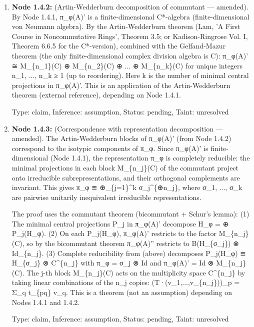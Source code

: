 \documentclass{article}
\begin{document}
\begin{enumerate}
\begin{enumerate}
  Type: claim, Inference: assumption, Status: validated, Taint: unresolved

\item \textbf{Node 1.4.2:} (Artin-Wedderburn decomposition of commutant — amended). By Node 1.4.1, π\_φ(A)' is a finite-dimensional C*-algebra (finite-dimensional von Neumann algebra). By the Artin-Wedderburn theorem (Lam, 'A First Course in Noncommutative Rings', Theorem 3.5; or Kadison-Ringrose Vol. I, Theorem 6.6.5 for the C*-version), combined with the Gelfand-Mazur theorem (the only finite-dimensional complex division algebra is C): π\_φ(A)' ≅ M\_\{n\_1\}(C) ⊕ M\_\{n\_2\}(C) ⊕ ... ⊕ M\_\{n\_k\}(C) for unique integers n\_1, ..., n\_k ≥ 1 (up to reordering). Here k is the number of minimal central projections in π\_φ(A)'. This is an application of the Artin-Wedderburn theorem (external reference), depending on Node 1.4.1.

  Type: claim, Inference: assumption, Status: pending, Taint: unresolved

\item \textbf{Node 1.4.3:} (Correspondence with representation decomposition — amended). The Artin-Wedderburn blocks of π\_φ(A)' (from Node 1.4.2) correspond to the isotypic components of π\_φ. Since π\_φ(A)' is finite-dimensional (Node 1.4.1), the representation π\_φ is completely reducible: the minimal projections in each block M\_\{n\_j\}(C) of the commutant project onto irreducible subrepresentations, and their orthogonal complements are invariant. This gives π\_φ ≅ ⊕\_\{j=1\}\textasciicircum{}k σ\_j\textasciicircum{}\{⊕n\_j\}, where σ\_1, ..., σ\_k are pairwise unitarily inequivalent irreducible representations.

The proof uses the commutant theorem (bicommutant + Schur's lemma): (1) The minimal central projections P\_j in π\_φ(A)' decompose H\_φ = ⊕ P\_j(H\_φ). (2) On each P\_j(H\_φ), π\_φ(A)' restricts to the factor M\_\{n\_j\}(C), so by the bicommutant theorem π\_φ(A)'' restricts to B(H\_\{σ\_j\}) ⊗ Id\_\{n\_j\}. (3) Complete reducibility from (above) decomposes P\_j(H\_φ) ≅ H\_\{σ\_j\} ⊗ C\textasciicircum{}\{n\_j\} with π\_φ = σ\_j ⊗ Id and π\_φ(A)' = Id ⊗ M\_\{n\_j\}(C). The j-th block M\_\{n\_j\}(C) acts on the multiplicity space C\textasciicircum{}\{n\_j\} by taking linear combinations of the n\_j copies: (T·(v\_1,...,v\_\{n\_j\}))\_p = Σ\_q t\_\{pq\} v\_q. This is a theorem (not an assumption) depending on Nodes 1.4.1 and 1.4.2.

  Type: claim, Inference: assumption, Status: pending, Taint: unresolved


\end{enumerate}
\end{enumerate}
\end{document}
